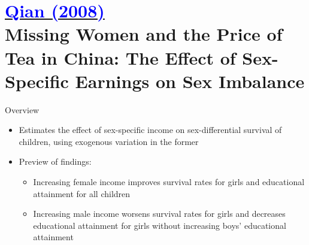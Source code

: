 \documentclass[11pt,notes=hide,aspectratio=169,mathserif]{beamer}
\begin{document}
\section*{\href{https://watermark.silverchair.com/123-3-1251.pdf?token=AQECAHi208BE49Ooan9kkhW_Ercy7Dm3ZL_9Cf3qfKAc485ysgAAA4MwggN_BgkqhkiG9w0BBwagggNwMIIDbAIBADCCA2UGCSqGSIb3DQEHATAeBglghkgBZQMEAS4wEQQM5oexR9-ezy51iFcTAgEQgIIDNvXO_WEQ2i7wsuSyrFh78JdyLp-nxQ69jjhzdxGYP3-y7cWm9HCEibHmZCw5vYxLPyLgMuYsZ4-LxYgQdiYZPK_zSeH6TFw9pInr2mJSOi2imv1wxlVSSWUiMou-Rp-U9FV6oNqdXRreflmIFwZKyFDIuFsoiN7pgwifThvGph3PMUb2qxD0UywfWjgf4rxeRPij6U49H7-Jin22nCEOW8ZTMHrRVtpVNmB4p3bwYwPzBwWfxoBwoQfd67OIvlZTpOD2C2XYpMAYjdPHyagmzHxCCTCLODnDBpEqpDls5XpdX24PJQ7H9PhBkEC4Qpa2DzDKKDZNgITi_otp491HJMc1GwAanJ-Uku_RgpBRy6cR4IG4FRZ3UCHa-Sh34UVVrOAVxZVaTTSMaE4733QHq_BeunEY17lRYOaj2zSgPpsXcvQ2L3X-bHXIIL2Sb5V0J7ZF7dXf0rI3Jl_jnPnSAxoYmVbIkyVRprv8YtB-P157Y3majgNT9RF4Cb3df1knyA1xOmLo02_a62Cl9Ye9murC4pUeU1S91DmM8dhRDO8JcN9qPyk2cekq1zjMm37TDzGEfWuOvaYZEES-jF-CAbUj8NgGULPQNLKm8rlje2vN6dEQJ8tSLncpAQHcs7qUqEyio0rnt_njur48ztBQkz8-7BowOICkn7jxg9PiVH03YrtkfezXh_WmvnB4zts9YUNcRIKpel0Z55OqPbUyr4iiXSdPTrS91JSzxMAwst5Antpju-nVDy4EGF9QITvHxsZH-VVpLRoxxQi8bdZHc_lIf6oxxMStsVnoeVX49L0EF_g5I1pazvMcPWNrjlfXGnvqELG9NvvBTHd00DGx9VK67F9T18soSQgJ8Mo1LNL8w20Ok_wY9EvFfDuYJ1GxGNPPN0u-pY-J2YFi9GI00KJ5mF6MDtkMCpikpf4zMhGdatHzfgJZO_DSxh3PMmEtQvvyfPWRfcMh7qxiOJbvuk614KWUsVNP1L7_DfQeeuN_4kOe8DdJ0DUtbsAsAtaR62L78jxemb0Ya1iLrUUbN7D9jwackNp4wZPFTfaC1_qXyHOgURoMQ_eUdI18Q1l1IGnhrZ4ZGQ}{\textcolor{blue}{Qian (2008)}} \\[5mm] 
\textnormal{\small{Missing Women and the Price of Tea in China: The Effect of Sex-Specific Earnings on Sex Imbalance}}}

\begin{frame}{Overview}
\begin{itemize}
\item Estimates the effect of sex-specific income on sex-differential survival of children, using exogenous variation in the former
\item Preview of findings:
\begin{itemize}
    \item Increasing female income improves survival rates for girls and educational attainment for all children
    \item Increasing male income worsens survival rates for girls and decreases educational attainment for girls without increasing boys' educational attainment
\end{itemize}
\end{itemize}
\end{frame}
\end{document}
